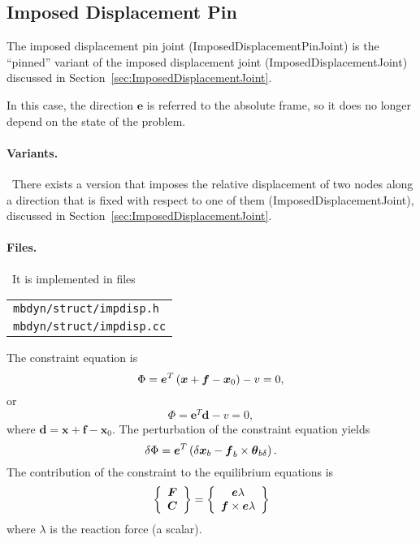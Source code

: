 \documentclass[10pt,dvips,fleqn,subeqn]{report}
\newcommand{\T}[1]{\boldsymbol{#1}}
\begin{document}
\subsection{Imposed Displacement Pin}
\label{sec:ImposedDisplacementPinJoint}
The imposed displacement pin joint (ImposedDisplacementPinJoint) 
is the ``pinned'' variant of the imposed displacement joint
(ImposedDisplacementJoint) discussed
in Section~\ref{sec:ImposedDisplacementJoint}.

In this case, the direction $\T{e}$ is referred to the absolute frame,
so it does no longer depend on the state of the problem.

\paragraph{Variants.} \
There exists a version that imposes the relative displacement of two nodes
along a direction that is fixed with respect to one of them 
(ImposedDisplacementJoint),
discussed in Section~\ref{sec:ImposedDisplacementJoint}.

\paragraph{Files.} \
It is implemented in files

\begin{tabular}{l}
\texttt{mbdyn/struct/impdisp.h} \\
\texttt{mbdyn/struct/impdisp.cc}
\end{tabular}

The constraint equation is
\begin{equation}
	\Phi = \T{e}^T \plbr{\T{x} + \T{f} - \T{x}_0} - v = 0 ,
\end{equation}
or
\begin{equation}
	\Phi = \T{e}^T \T{d} - v = 0 ,
\end{equation}
where $\T{d}=\T{x} + \T{f} - \T{x}_0$.
The perturbation of the constraint equation yields
\begin{equation}
	\delta\Phi = 
		\T{e}^T \plbr{\delta\T{x}_b
		- \T{f}_b\times\T{\theta}_{b\delta}
		} .
\end{equation}
The contribution of the constraint to the equilibrium equations is
\begin{equation}
	\cubr{\cvvect{
		\T{F} \\
		\T{C}
	}} = \cubr{\cvvect{
		\T{e} \lambda \\
		\T{f} \times \T{e} \lambda
	}}
\end{equation}
where $\lambda$ is the reaction force (a scalar).
\end{document}
